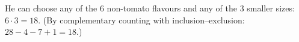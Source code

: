 He can choose any of the $6$ non-tomato flavours and any of the $3$ smaller sizes: $6\cdot3=\boxed{18}$. (By complementary counting with inclusion--exclusion: $28-4-7+1=18$.)
